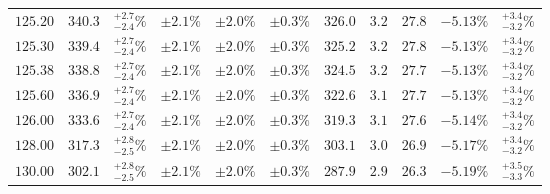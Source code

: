 \begin{table}[ht!]
{{\begin{tabular}{| cc | c | ccc | cccc | c |}
$125.20$ & $340.3$ & $^{+2.7}_{-2.4}\%$ & $\pm 2.1\%$ & {\color{black!55}$\pm 2.0\%$} & {\color{black!55}$\pm 0.3\%$} & $326.0$ & $3.2$ & $27.8$ & $-5.13\%$ & $^{+3.4}_{-3.2}\%$ \\
$125.30$ & $339.4$ & $^{+2.7}_{-2.4}\%$ & $\pm 2.1\%$ & {\color{black!55}$\pm 2.0\%$} & {\color{black!55}$\pm 0.3\%$} & $325.2$ & $3.2$ & $27.8$ & $-5.13\%$ & $^{+3.4}_{-3.2}\%$ \\
$125.38$ & $338.8$ & $^{+2.7}_{-2.4}\%$ & $\pm 2.1\%$ & {\color{black!55}$\pm 2.0\%$} & {\color{black!55}$\pm 0.3\%$} & $324.5$ & $3.2$ & $27.7$ & $-5.13\%$ & $^{+3.4}_{-3.2}\%$ \\
$125.60$ & $336.9$ & $^{+2.7}_{-2.4}\%$ & $\pm 2.1\%$ & {\color{black!55}$\pm 2.0\%$} & {\color{black!55}$\pm 0.3\%$} & $322.6$ & $3.1$ & $27.7$ & $-5.13\%$ & $^{+3.4}_{-3.2}\%$ \\
$126.00$ & $333.6$ & $^{+2.7}_{-2.4}\%$ & $\pm 2.1\%$ & {\color{black!55}$\pm 2.0\%$} & {\color{black!55}$\pm 0.3\%$} & $319.3$ & $3.1$ & $27.6$ & $-5.14\%$ & $^{+3.4}_{-3.2}\%$ \\
$128.00$ & $317.3$ & $^{+2.8}_{-2.5}\%$ & $\pm 2.1\%$ & {\color{black!55}$\pm 2.0\%$} & {\color{black!55}$\pm 0.3\%$} & $303.1$ & $3.0$ & $26.9$ & $-5.17\%$ & $^{+3.4}_{-3.2}\%$ \\
$130.00$ & $302.1$ & $^{+2.8}_{-2.5}\%$ & $\pm 2.1\%$ & {\color{black!55}$\pm 2.0\%$} & {\color{black!55}$\pm 0.3\%$} & $287.9$ & $2.9$ & $26.3$ & $-5.19\%$ & $^{+3.5}_{-3.3}\%$ \\
\cline{1-11}
\end{tabular}
}
}
\end{table}

